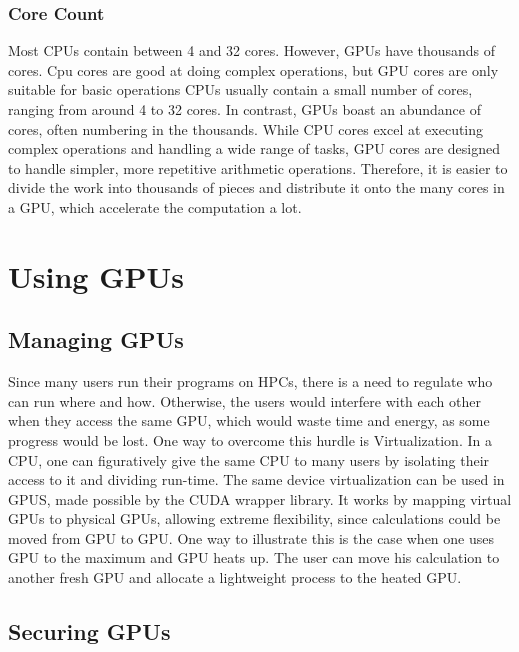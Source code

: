 \documentclass[conference]{IEEEtran}
\begin{document}
\subsubsection{Core Count}


Most CPUs contain between 4 and 32 cores. However, GPUs have thousands of cores. Cpu cores are good at doing complex operations, but GPU cores are only suitable for basic operations
CPUs usually contain a small number of cores, ranging from around 4 to 32 cores. In contrast, GPUs boast an abundance of cores, often numbering in the thousands. While CPU cores excel at executing complex operations and handling a wide range of tasks, GPU cores are designed to handle simpler, more repetitive arithmetic operations. Therefore, it is easier to divide the work into thousands of pieces and distribute it onto the many cores in a GPU, which accelerate the computation a lot.


\section{Using GPUs}
\subsection{Managing GPUs}
Since many users run their programs on HPCs, there is a need to regulate who can run where and how. Otherwise, the users would interfere with each other when they access the same GPU, which would waste time and energy, as some progress would be lost. One way to overcome this hurdle is Virtualization. In a CPU, one can figuratively give the same CPU to many users by isolating their access to it and dividing run-time. The same device virtualization can be used in GPUS, made possible by the CUDA wrapper library. It works by mapping virtual GPUs to physical GPUs, allowing extreme flexibility, since calculations could be moved from GPU to GPU. One way to illustrate this is the case when one uses GPU to the maximum and GPU heats up. The user can move his calculation to another fresh GPU and allocate a lightweight process to the heated GPU. \cite{b5}

\subsection{Securing GPUs}
\end{document}
